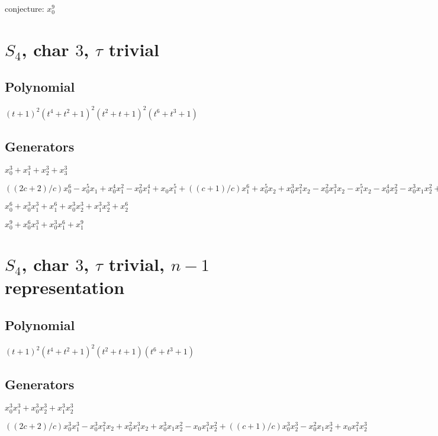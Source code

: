 \documentclass{article}
\numberwithin{equation}{section}
\begin{document}
conjecture: $x_0^9$

\section{$S_4$, char $3$, $\tau$ trivial}

\subsection{Polynomial}

$(t+1)^2(t^4+t^2+1)^2(t^2+t+1)^2(t^6+t^3+1)$

\subsection{Generators}

$x_0^3 + x_1^3 + x_2^3 + x_3^3$

$((2c + 2)/c)x_0^6 - x_0^5x_1 + x_0^4x_1^2 - x_0^2x_1^4 + x_0x_1^5
+ ((c + 1)/c)x_1^6 + x_0^5x_2 + x_0^3x_1^2x_2 - x_0^2x_1^3x_2 -
x_1^5x_2 - x_0^4x_2^2 - x_0^3x_1x_2^2 + x_0x_1^3x_2^2 +
x_1^4x_2^2 + ((c + 1)/c)x_0^3x_2^3 + x_0^2x_1x_2^3 -
x_0x_1^2x_2^3 + ((2c + 2)/c)x_1^3x_2^3 + x_0^2x_2^4 - x_1^2x_2^4
- x_0x_2^5 + x_1x_2^5 + x_0^3x_1^2x_3 - x_0^2x_1^3x_3 -
x_0^3x_2^2x_3 + x_1^3x_2^2x_3 + x_0^2x_2^3x_3 - x_1^2x_2^3x_3 -
x_0^3x_1x_3^2 + x_0x_1^3x_3^2 + x_0^3x_2x_3^2 - x_1^3x_2x_3^2 -
x_0x_2^3x_3^2 + x_1x_2^3x_3^2$

$x_0^6 + x_0^3x_1^3 + x_1^6 + x_0^3x_2^3 + x_1^3x_2^3 + x_2^6$

$x_0^9 + x_0^6x_1^3 + x_0^3x_1^6 + x_1^9$


\section{$S_4$, char $3$, $\tau$ trivial, $n-1$ representation}

\subsection{Polynomial}

$(t+1)^2(t^4+t^2+1)^2(t^2+t+1)(t^6+t^3+1)$


\subsection{Generators}

$x_0^3x_1^3 + x_0^3x_2^3 + x_1^3x_2^3$ 

$((2c + 2)/c)x_0^3x_1^3 - x_0^3x_1^2x_2 + x_0^2x_1^3x_2 + x_0^3x_1x_2^2 - x_0x_1^3x_2^2 + ((c + 1)/c)x_0^3x_2^3 - x_0^2x_1x_2^3 + x_0x_1^2x_2^3$  %
\end{document}
